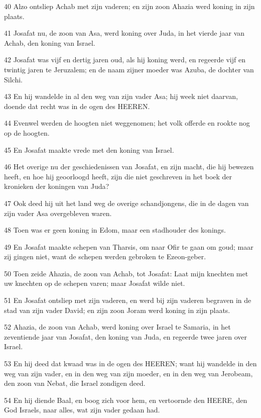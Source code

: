 \par 40 Alzo ontsliep Achab met zijn vaderen; en zijn zoon Ahazia werd koning in zijn plaats.
\par 41 Josafat nu, de zoon van Asa, werd koning over Juda, in het vierde jaar van Achab, den koning van Israel.
\par 42 Josafat was vijf en dertig jaren oud, als hij koning werd, en regeerde vijf en twintig jaren te Jeruzalem; en de naam zijner moeder was Azuba, de dochter van Silchi.
\par 43 En hij wandelde in al den weg van zijn vader Asa; hij week niet daarvan, doende dat recht was in de ogen des HEEREN.
\par 44 Evenwel werden de hoogten niet weggenomen; het volk offerde en rookte nog op de hoogten.
\par 45 En Josafat maakte vrede met den koning van Israel.
\par 46 Het overige nu der geschiedenissen van Josafat, en zijn macht, die hij bewezen heeft, en hoe hij geoorloogd heeft, zijn die niet geschreven in het boek der kronieken der koningen van Juda?
\par 47 Ook deed hij uit het land weg de overige schandjongens, die in de dagen van zijn vader Asa overgebleven waren.
\par 48 Toen was er geen koning in Edom, maar een stadhouder des konings.
\par 49 En Josafat maakte schepen van Tharsis, om naar Ofir te gaan om goud; maar zij gingen niet, want de schepen werden gebroken te Ezeon-geber.
\par 50 Toen zeide Ahazia, de zoon van Achab, tot Josafat: Laat mijn knechten met uw knechten op de schepen varen; maar Josafat wilde niet.
\par 51 En Josafat ontsliep met zijn vaderen, en werd bij zijn vaderen begraven in de stad van zijn vader David; en zijn zoon Joram werd koning in zijn plaats.
\par 52 Ahazia, de zoon van Achab, werd koning over Israel te Samaria, in het zeventiende jaar van Josafat, den koning van Juda, en regeerde twee jaren over Israel.
\par 53 En hij deed dat kwaad was in de ogen des HEEREN; want hij wandelde in den weg van zijn vader, en in den weg van zijn moeder, en in den weg van Jerobeam, den zoon van Nebat, die Israel zondigen deed.
\par 54 En hij diende Baal, en boog zich voor hem, en vertoornde den HEERE, den God Israels, naar alles, wat zijn vader gedaan had.



